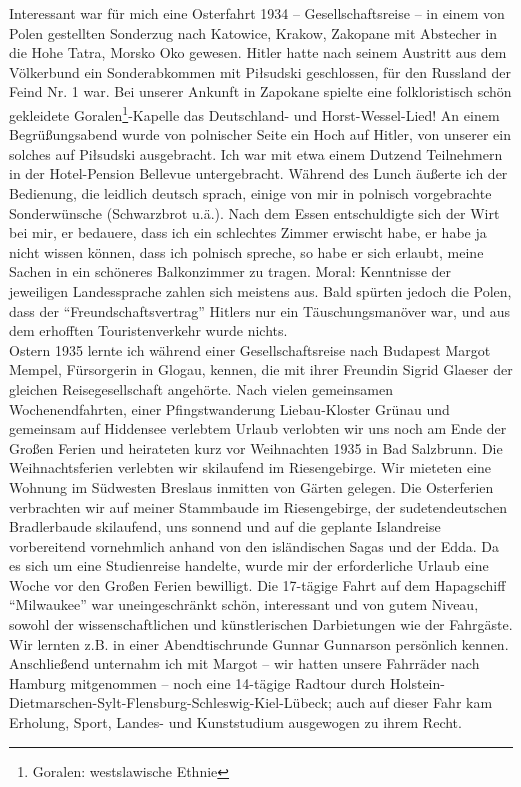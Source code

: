 \documentclass[a5paper,pagesize,10pt,twoside=true]{scrbook}
\renewcommand{\marginpar}[2][]{}
\begin{document}
Interessant war für mich eine Osterfahrt 1934 -- Gesellschaftsreise -- in einem von Polen gestellten Sonderzug nach Katowice, Krakow, Zakopane mit Abstecher in die Hohe Tatra, Morsko Oko gewesen. Hitler hatte nach seinem Austritt aus dem Völkerbund ein Sonderabkommen mit Piłsudski geschlossen, für den Russland der Feind Nr. 1 war. Bei unserer Ankunft in Zapokane spielte eine folkloristisch schön gekleidete Goralen\footnote{Goralen: westslawische Ethnie}-Kapelle das Deutschland- und Horst-Wessel-Lied! An einem Begrüßungsabend wurde von polnischer Seite ein Hoch auf Hitler, von unserer ein solches auf Piłsudski ausgebracht. Ich war mit etwa einem Dutzend Teilnehmern in der Hotel-Pension Bellevue untergebracht. Während des Lunch äußerte ich der Bedienung, die leidlich deutsch sprach, einige von mir in polnisch vorgebrachte Sonderwünsche (Schwarzbrot u.ä.). Nach dem Essen entschuldigte sich der Wirt bei mir, er bedauere, dass ich ein schlechtes Zimmer erwischt habe, er habe ja nicht wissen können, dass ich polnisch spreche, so habe er sich erlaubt, meine Sachen in ein schöneres Balkonzimmer zu tragen. Moral: Kenntnisse der jeweiligen Landessprache zahlen sich meistens aus. Bald spürten jedoch die Polen, dass der \enquote{Freundschaftsvertrag} Hitlers nur ein Täuschungsmanöver war, und aus dem erhofften Touristenverkehr wurde nichts.\\

Ostern 1935 lernte ich während einer Gesellschaftsreise nach Budapest Margot Mempel, Fürsorgerin in Glogau, kennen, die mit ihrer Freundin Sigrid Glaeser der gleichen Reisegesellschaft angehörte. Nach vielen gemeinsamen Wochenendfahrten, einer Pfingstwanderung Liebau-Kloster Grünau und gemeinsam auf Hiddensee verlebtem Urlaub verlobten wir uns noch am Ende der Großen Ferien und heirateten kurz vor Weihnachten 1935 in Bad Salzbrunn. Die Weihnachtsferien verlebten wir skilaufend im Riesengebirge. Wir mieteten eine Wohnung im Südwesten Breslaus inmitten von Gärten gelegen. Die Osterferien verbrachten wir auf meiner Stammbaude im Riesengebirge, der sudetendeutschen Bradlerbaude skilaufend, uns sonnend und auf die geplante Islandreise vorbereitend vornehmlich anhand von den isländischen Sagas und der Edda. Da es sich um eine Studienreise handelte, wurde mir der erforderliche Urlaub eine Woche vor den Großen Ferien bewilligt. Die 17-tägige Fahrt auf dem Hapagschiff \enquote{Milwaukee} war uneingeschränkt schön, interessant und von gutem Niveau, sowohl der wissenschaftlichen und künstlerischen Darbietungen wie der Fahrgäste. Wir lernten z.B. in einer Abendtischrunde Gunnar Gunnarson persönlich kennen. \marginpar{17} Anschließend unternahm ich mit Margot -- wir hatten unsere Fahrräder nach Hamburg mitgenommen -- noch eine 14-tägige Radtour durch Holstein-Dietmarschen-Sylt-Flensburg-Schleswig-Kiel-Lübeck; auch auf dieser Fahr kam Erholung, Sport, Landes- und Kunststudium ausgewogen zu ihrem Recht.
\end{document}
